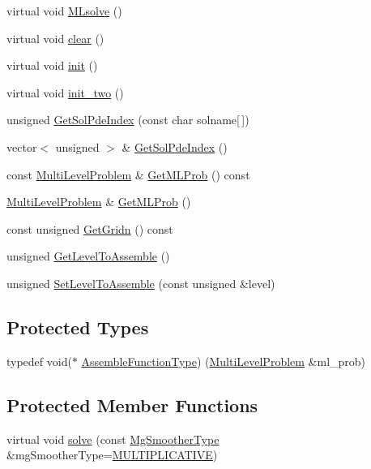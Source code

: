 \begin{DoxyCompactItemize}
\item 
virtual void \mbox{\hyperlink{classfemus_1_1_system_afb6e3e4b80b68e8cdcf5b0188313d010}{M\+Lsolve}} ()
\item 
virtual void \mbox{\hyperlink{classfemus_1_1_system_ad1a19dbff3cea3d496cdb530ea2bca19}{clear}} ()
\item 
virtual void \mbox{\hyperlink{classfemus_1_1_system_a1defaa9e59d3aa2ac62aa7fa111b6e32}{init}} ()
\item 
virtual void \mbox{\hyperlink{classfemus_1_1_system_ae238425d65a58eb22b3925309d9d0bef}{init\+\_\+two}} ()
\item 
unsigned \mbox{\hyperlink{classfemus_1_1_system_a4ebc859deb32b54c9936fa28f1485a93}{Get\+Sol\+Pde\+Index}} (const char solname\mbox{[}$\,$\mbox{]})
\item 
vector$<$ unsigned $>$ \& \mbox{\hyperlink{classfemus_1_1_system_a5006f00150911f0c1b6cb6d3fa9b2a6e}{Get\+Sol\+Pde\+Index}} ()
\item 
const \mbox{\hyperlink{classfemus_1_1_multi_level_problem}{Multi\+Level\+Problem}} \& \mbox{\hyperlink{classfemus_1_1_system_a57025b8e170e8c36141b701a8353a35b}{Get\+M\+L\+Prob}} () const
\item 
\mbox{\hyperlink{classfemus_1_1_multi_level_problem}{Multi\+Level\+Problem}} \& \mbox{\hyperlink{classfemus_1_1_system_ae73a571afd1799365f6a807dfde74641}{Get\+M\+L\+Prob}} ()
\item 
const unsigned \mbox{\hyperlink{classfemus_1_1_system_a7d62291adc624e55f78ca2d1c32c6971}{Get\+Gridn}} () const
\item 
unsigned \mbox{\hyperlink{classfemus_1_1_system_a0f1050943e8187087773955c920e3f23}{Get\+Level\+To\+Assemble}} ()
\item 
unsigned \mbox{\hyperlink{classfemus_1_1_system_a04558397f2ff92fc658579c7f8fdf882}{Set\+Level\+To\+Assemble}} (const unsigned \&level)
\end{DoxyCompactItemize}
\subsection*{Protected Types}
\begin{DoxyCompactItemize}
\item 
typedef void($\ast$ \mbox{\hyperlink{classfemus_1_1_system_ae71fa78abbc4b3efe8ef1dc057275b9b}{Assemble\+Function\+Type}}) (\mbox{\hyperlink{classfemus_1_1_multi_level_problem}{Multi\+Level\+Problem}} \&ml\+\_\+prob)
\end{DoxyCompactItemize}
\subsection*{Protected Member Functions}
\begin{DoxyCompactItemize}
\item 
virtual void \mbox{\hyperlink{classfemus_1_1_system_a223d0ee32326556800eeb423bd9abbfb}{solve}} (const \mbox{\hyperlink{_mg_type_enum_8hpp_aec11e12c1f11a6ad959d3280ae0ee9a8}{Mg\+Smoother\+Type}} \&mg\+Smoother\+Type=\mbox{\hyperlink{_mg_type_enum_8hpp_aec11e12c1f11a6ad959d3280ae0ee9a8a2618be531dddb3647be5874ddcae5164}{M\+U\+L\+T\+I\+P\+L\+I\+C\+A\+T\+I\+VE}})
\end{DoxyCompactItemize}
